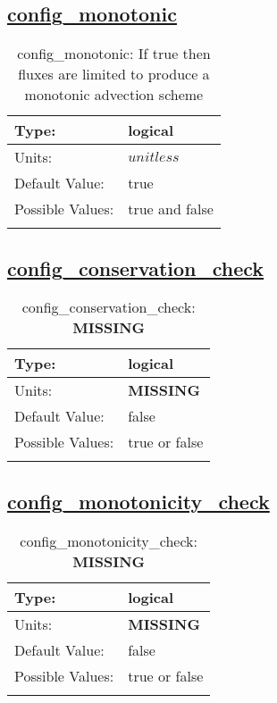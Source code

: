 \subsection[config\_monotonic]{\hyperref[sec:nm_tab_advection]{config\_monotonic}}
\label{subsec:nm_sec_config_monotonic}
\begin{center}
\begin{longtable}{| p{2.0in} || p{4.0in} |}
    \hline
    Type: & logical \\
    \hline
    Units: & $unitless$ \\
    \hline
    Default Value: & true \\
    \hline
    Possible Values: & true and false \\
    \hline
    \caption{config\_monotonic: If true then fluxes are limited to produce a monotonic advection scheme}
\end{longtable}
\end{center}
\subsection[config\_conservation\_check]{\hyperref[sec:nm_tab_advection]{config\_conservation\_check}}
\label{subsec:nm_sec_config_conservation_check}
\begin{center}
\begin{longtable}{| p{2.0in} || p{4.0in} |}
    \hline
    Type: & logical \\
    \hline
    Units: & {\bf \color{red} MISSING} \\
    \hline
    Default Value: & false \\
    \hline
    Possible Values: & true or false \\
    \hline
    \caption{config\_conservation\_check: {\bf \color{red} MISSING}}
\end{longtable}
\end{center}
\subsection[config\_monotonicity\_check]{\hyperref[sec:nm_tab_advection]{config\_monotonicity\_check}}
\label{subsec:nm_sec_config_monotonicity_check}
\begin{center}
\begin{longtable}{| p{2.0in} || p{4.0in} |}
    \hline
    Type: & logical \\
    \hline
    Units: & {\bf \color{red} MISSING} \\
    \hline
    Default Value: & false \\
    \hline
    Possible Values: & true or false \\
    \hline
    \caption{config\_monotonicity\_check: {\bf \color{red} MISSING}}
\end{longtable}
\end{center}
